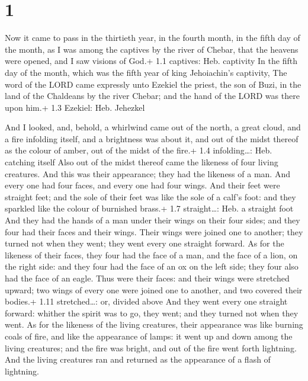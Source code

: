 \hypertarget{section}{%
\section{1}\label{section}}

 Now it came to pass in the thirtieth year, in the fourth
month, in the fifth day of the month, as I was among the captives by the
river of Chebar, that the heavens were opened, and I saw visions of
God.+ 1.1 captives: Heb. captivity  In the fifth day of the
month, which was the fifth year of king Jehoiachin's captivity,
 The word of the LORD came expressly unto Ezekiel the
priest, the son of Buzi, in the land of the Chaldeans by the river
Chebar; and the hand of the LORD was there upon him.+ 1.3 Ezekiel: Heb.
Jehezkel

 And I looked, and, behold, a whirlwind came out of the
north, a great cloud, and a fire infolding itself, and a brightness was
about it, and out of the midst thereof as the colour of amber, out of
the midst of the fire.+ 1.4 infolding\ldots: Heb. catching itself
 Also out of the midst thereof came the likeness of four
living creatures. And this was their appearance; they had the likeness
of a man.  And every one had four faces, and every one had
four wings.  And their feet were straight feet; and the sole
of their feet was like the sole of a calf's foot: and they sparkled like
the colour of burnished brass.+ 1.7 straight\ldots: Heb. a straight foot
 And they had the hands of a man under their wings on their
four sides; and they four had their faces and their wings. 
Their wings were joined one to another; they turned not when they went;
they went every one straight forward.  As for the likeness
of their faces, they four had the face of a man, and the face of a lion,
on the right side: and they four had the face of an ox on the left side;
they four also had the face of an eagle.  Thus were their
faces: and their wings were stretched upward; two wings of every one
were joined one to another, and two covered their bodies.+ 1.11
stretched\ldots: or, divided above  And they went every one
straight forward: whither the spirit was to go, they went; and they
turned not when they went.  As for the likeness of the
living creatures, their appearance was like burning coals of fire, and
like the appearance of lamps: it went up and down among the living
creatures; and the fire was bright, and out of the fire went forth
lightning.  And the living creatures ran and returned as
the appearance of a flash of lightning.

